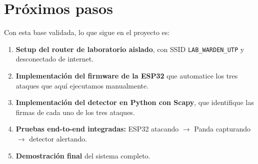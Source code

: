 \documentclass[11pt,a4paper]{article}
\begin{document}
\section{Próximos pasos}

Con esta base validada, lo que sigue en el proyecto es:

\begin{enumerate}
  \item \textbf{Setup del router de laboratorio aislado}, con SSID
    \texttt{LAB\_WARDEN\_UTP} y desconectado de internet.
  \item \textbf{Implementación del firmware de la ESP32} que automatice
    los tres ataques que aquí ejecutamos manualmente.
  \item \textbf{Implementación del detector en Python con Scapy}, que
    identifique las firmas de cada uno de los tres ataques.
  \item \textbf{Pruebas end-to-end integradas:} ESP32 atacando
    $\rightarrow$ Panda capturando $\rightarrow$ detector alertando.
  \item \textbf{Demostración final} del sistema completo.
\end{enumerate}
\end{document}

